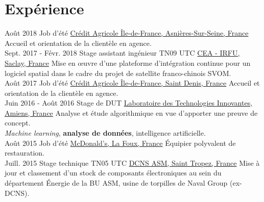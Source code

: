 \documentclass[letterpaper]{twentysecondcv} %
\begin{document}
\section{Expérience}

\begin{twenty} %
    \twentyitem
    	{Août 2018}
		{}
        {Job d'été}
        {\href{https://ca-paris.com/}{Crédit Agricole Île-de-France, Asnières-Sur-Seine, France}}
        {}
        {Accueil et orientation de la clientèle en agence.}
    \\
    \twentyitem
    	{Sept. 2017 -}
		{Févr. 2018}
        {Stage assistant ingénieur TN09 UTC}
        {\href{http://irfu.cea.fr/}{CEA - IRFU, Saclay, France}}
        {}
        {Mise en œuvre d'une plateforme d'intégration continue pour un logiciel spatial dans le cadre du projet de satellite franco-chinois SVOM.}
    \\
    \twentyitem
    	{Août 2017}
		{}
        {Job d'été}
        {\href{https://ca-paris.com/}{Crédit Agricole Île-de-France, Saint Denis, France}}
        {}
        {Accueil et orientation de la clientèle en agence.}
    \\
	\twentyitem
    	{Juin 2016 -}
		{Août 2016}
        {Stage de DUT}
        {\href{http://lti-picardie.fr/}{Laboratoire des Technologies Innovantes, Amiens, France}}
        {}
        {Analyse et étude algorithmique en vue d'apporter une preuve de concept.\\\textit{Machine learning}, \textbf{analyse de données}, intelligence artificielle.}
    \\   
    \twentyitem
   		{Août 2015}
        {}
        {Job d'été}
        {\href{https://www.restaurants.mcdonalds.fr/mcdonalds-gassin}{McDonald's, La Foux, France}}
        {}
        {Équipier polyvalent de restauration.}
     \\
     \twentyitem
   		{Juill. 2015}
		{}
        {Stage technique TN05 UTC}
        {\href{https://www.naval-group.com/fr/}{DCNS ASM, Saint Tropez, France}}
        {}
        {Mise à jour et classement d'un stock de composants électroniques au sein du département Énergie de la BU ASM, usine de torpilles de Naval Group (ex-DCNS).}
        
\end{twenty}

\end{document}
